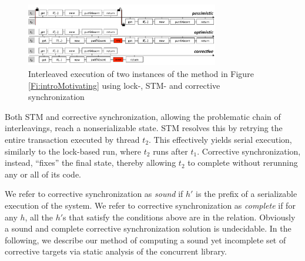 \begin{figure}
	\begin{center}
	\includegraphics[width=0.75\textwidth]{OverviewSlide.pdf}
	\end{center}
	\caption{\label{Fi:motivatingOverview}Interleaved execution of two instances of the method in Figure \ref{Fi:introMotivating} using lock-, STM- and corrective synchronization}
\end{figure}

Both STM and corrective synchronization, allowing the problematic chain of interleavings, reach a nonserializable state. STM resolves this by retrying the entire transaction executed by thread $t_2$. This effectively yields serial execution, similarly to the lock-based run, where $t_2$ runs after $t_1$. Corrective synchronization, instead, ``fixes'' the final state, thereby allowing $t_2$ to complete without rerunning any or all of its code.

We refer to corrective synchronization as \emph{sound} if $h'$ is the prefix of a serializable execution of the system. We refer to corrective synchronization as \emph{complete} if for any $h$, all the $h'$s that satisfy the conditions above are in the relation. Obviously a sound and complete corrective synchronization solution is undecidable. In the following, we describe our method of computing a sound yet incomplete set of corrective targets via static analysis of the concurrent library.

